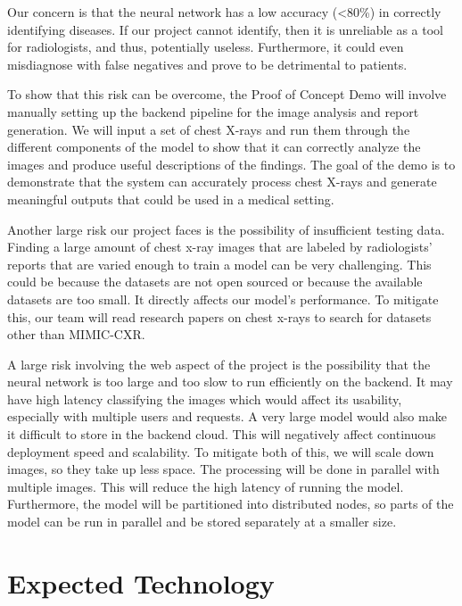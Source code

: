 \documentclass{article}
\begin{document}
Our concern is that the neural network has a low accuracy (<80\%) in correctly identifying
diseases. If our project cannot identify, then it is unreliable as a tool for radiologists, and
thus, potentially useless. Furthermore, it could even misdiagnose with false negatives and prove 
to be detrimental to patients.

To show that this risk can be overcome, the Proof of Concept Demo will involve
manually setting up the backend pipeline for the image analysis and report generation.
We will input a set of chest X-rays and run them through the different components of
the model to show that it can correctly analyze the images and produce useful
descriptions of the findings. The goal of the demo is to demonstrate that the system
can accurately process chest X-rays and generate meaningful outputs that could be
used in a medical setting.

Another large risk our project faces is the possibility of insufficient testing data. Finding a 
large amount of chest x-ray images that are labeled by radiologists' reports that are varied 
enough to train a model can be very challenging. This could be because the datasets are not 
open sourced or because the available datasets are too small. It directly affects our model's 
performance. To mitigate this, our team will read research papers on chest x-rays to search for 
datasets other than MIMIC-CXR.

A large risk involving the web aspect of the project is the possibility that the neural network is
too large and too slow to run efficiently on the backend. It may have high latency classifying the
images which would affect its usability, especially with multiple users and requests. A very large
model would also make it difficult to store in the backend cloud. This will negatively affect 
continuous deployment speed and scalability. To mitigate both of this, we will scale down images,
so they take up less space. The processing will be done in parallel with multiple images. This will
reduce the high latency of running the model. Furthermore, the model will be partitioned into 
distributed nodes, so parts of the model can be run in parallel and be stored separately at a 
smaller size.

\section{Expected Technology}
\end{document}
